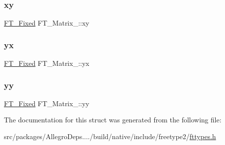 \subsubsection{\texorpdfstring{xy}{xy}}
{\footnotesize\ttfamily \hyperlink{fttypes_8h_a5f5a679cc09f758efdd0d1c5feed3c3d}{F\+T\+\_\+\+Fixed} F\+T\+\_\+\+Matrix\+\_\+\+::xy}

\mbox{\label{struct_f_t___matrix___a55792583a843a1611b43c40534a02a17}} 
\subsubsection{\texorpdfstring{yx}{yx}}
{\footnotesize\ttfamily \hyperlink{fttypes_8h_a5f5a679cc09f758efdd0d1c5feed3c3d}{F\+T\+\_\+\+Fixed} F\+T\+\_\+\+Matrix\+\_\+\+::yx}

\mbox{\label{struct_f_t___matrix___a689a6fd20a88238788b90c3597ee0c2a}} 
\subsubsection{\texorpdfstring{yy}{yy}}
{\footnotesize\ttfamily \hyperlink{fttypes_8h_a5f5a679cc09f758efdd0d1c5feed3c3d}{F\+T\+\_\+\+Fixed} F\+T\+\_\+\+Matrix\+\_\+\+::yy}



The documentation for this struct was generated from the following file\+:\begin{DoxyCompactItemize}
\item 
src/packages/\+Allegro\+Deps..../build/native/include/freetype2/\hyperlink{fttypes_8h}{fttypes.\+h}\end{DoxyCompactItemize}
